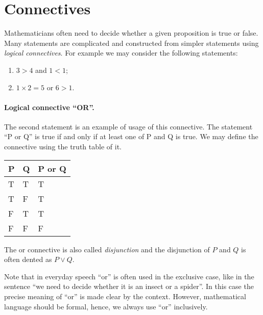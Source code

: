 \section{Connectives}

Mathematicians often need to decide whether a given proposition is true or
false. Many statements are complicated and constructed from simpler statements
using \emph{logical connectives}. For example we may consider the following
statements:
\begin{enumerate}
  \item $3 > 4$ and $1 < 1$;
  \item $1 \times 2 = 5$ or $6 > 1$.
\end{enumerate}

\paragraph{Logical connective ``OR''.}
The second statement is an example of usage of this connective. The statement
``P or Q'' is true if and only if at least one of P and Q is true. We may
define the connective using the truth table of it.
\begin{center}
    \begin{tabular}{l l l}
        \toprule
        P & Q & P or Q \\
        \midrule
        T & T & T \\
        T & F & T \\
        F & T & T \\
        F & F & F \\
        \bottomrule
  \end{tabular}
\end{center}

The or connective is also called \emph{disjunction} and the disjunction of $P$
and $Q$ is often dented as $P \lor Q$.


\begin{warning}
  Note that in everyday speech ``or'' is often used in the exclusive case, like
  in the sentence ``we need to decide whether it is an insect or a spider''.
  In this case the precise meaning of ``or'' is made clear by the context.
  However, mathematical language should be formal, hence, we always use ``or''
  inclusively.
\end{warning}

